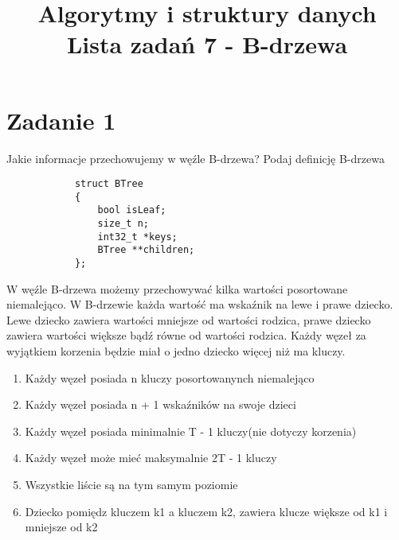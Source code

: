 \documentclass{article}
\title {
    \Huge\textbf{Algorytmy i struktury danych} \\
    \vspace{2mm}
    \huge{Lista zadań 7 - B-drzewa} 
    \date{}
}
\begin{document}
    \maketitle
    \boldmath
    \section*{Zadanie 1}
        Jakie informacje przechowujemy w węźle B-drzewa? Podaj definicję
        B-drzewa

        \begin{lstlisting}
            struct BTree
            {
                bool isLeaf;
                size_t n;
                int32_t *keys;
                BTree **children;
            };
        \end{lstlisting}

        W węźle B-drzewa możemy przechowywać kilka wartości posortowane niemalejąco.
        W B-drzewie każda wartość ma wskaźnik na lewe i prawe dziecko. Lewe dziecko
        zawiera wartości mniejsze od wartości rodzica, prawe dziecko zawiera wartości
        większe bądź równe od wartości rodzica. Każdy węzeł za wyjątkiem korzenia 
        będzie miał o jedno dziecko więcej niż ma kluczy.
        \begin{enumerate}
            \item Każdy węzeł posiada n kluczy posortowanynch niemalejąco
            \item Każdy węzeł posiada n + 1 wskaźników na swoje dzieci
            \item Każdy węzeł posiada minimalnie T - 1 kluczy(nie dotyczy korzenia)
            \item Każdy węzeł może mieć maksymalnie 2T - 1 kluczy
            \item Wszystkie liście są na tym samym poziomie
            \item Dziecko pomiędz kluczem k1 a kluczem k2, zawiera klucze większe
            od k1 i mniejsze od k2
        \end{enumerate} 
\end{document}
